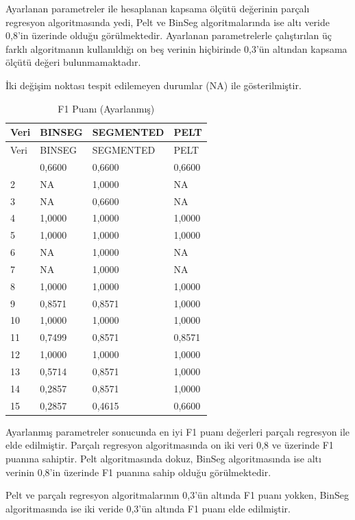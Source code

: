 \documentclass[12pt,twoside]{deuthesis}
\begin{document}
Ayarlanan parametreler ile hesaplanan kapsama ölçütü değerinin parçalı regresyon algoritmasında yedi, Pelt ve BinSeg algoritmalarında ise altı veride 0,8'in üzerinde olduğu görülmektedir.
Ayarlanan parametrelerle çalıştırılan üç farklı algoritmanın kullanıldığı on beş verinin hiçbirinde 0,3'ün altından kapsama ölçütü değeri bulunmamaktadır.

İki değişim noktası tespit edilemeyen durumlar (NA) ile gösterilmiştir.

\begin{longtable}[]{@{}llll@{}}
\caption{\label{tab:nvar7} F1 Puanı (Ayarlanmış)}\tabularnewline
\toprule\noalign{}
Veri & BINSEG & SEGMENTED & PELT \\
\midrule\noalign{}
\endfirsthead
\toprule\noalign{}
Veri & BINSEG & SEGMENTED & PELT \\
\midrule\noalign{}
\endhead
\bottomrule\noalign{}
\endlastfoot
1 & 0,6600 & 0,6600 & 0,6600 \\
2 & NA & 1,0000 & NA \\
3 & NA & 0,6600 & NA \\
4 & 1,0000 & 1,0000 & 1,0000 \\
5 & 1,0000 & 1,0000 & 1,0000 \\
6 & NA & 1,0000 & NA \\
7 & NA & 1,0000 & NA \\
8 & 1,0000 & 1,0000 & 1,0000 \\
9 & 0,8571 & 0,8571 & 1,0000 \\
10 & 1,0000 & 1,0000 & 1,0000 \\
11 & 0,7499 & 0,8571 & 0,8571 \\
12 & 1,0000 & 1,0000 & 1,0000 \\
13 & 0,5714 & 0,8571 & 1,0000 \\
14 & 0,2857 & 0,8571 & 1,0000 \\
15 & 0,2857 & 0,4615 & 0,6600 \\
\end{longtable}

Ayarlanmış parametreler sonucunda en iyi F1 puanı değerleri parçalı regresyon ile elde edilmiştir. Parçalı regresyon algoritmasında on iki veri 0,8 ve üzerinde F1 puanına sahiptir. Pelt algoritmasında dokuz, BinSeg algoritmasında ise altı verinin 0,8'in üzerinde F1 puanına sahip olduğu görülmektedir.

Pelt ve parçalı regresyon algoritmalarının 0,3'ün altında F1 puanı yokken, BinSeg algoritmasında ise iki veride 0,3'ün altında F1 puanı elde edilmiştir.
\end{document}
